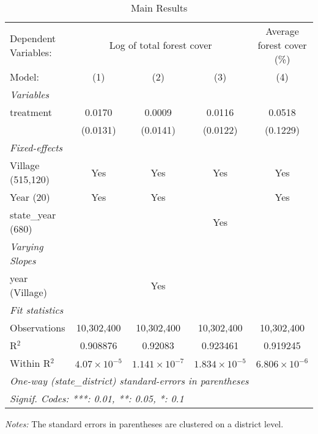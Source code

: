 \begin{table}[htbp]
\centering
\caption{\label{tab:main-results} Main Results}
\begin{tabular}{lcccc}
\tabularnewline\midrule\midrule
Dependent Variables:&\multicolumn{3}{c}{Log of total forest cover}&Average forest cover (\%)\\
Model:&(1) & (2) & (3) & (4)\\
\midrule \emph{Variables}&   &   &   &  \\
treatment&0.0170 & 0.0009 & 0.0116 & 0.0518\\
  &(0.0131) & (0.0141) & (0.0122) & (0.1229)\\
\midrule \emph{Fixed-effects}&   &   &   &  \\
Village (515,120) & Yes & Yes & Yes & Yes\\
Year (20) & Yes & Yes &  & Yes\\
state\_year (680) &  &  & Yes & \\
\midrule \emph{Varying Slopes}&   &   &   &  \\
year (Village) &  & Yes &  & \\
\midrule \emph{Fit statistics}&  & & & \\
Observations & 10,302,400&10,302,400&10,302,400&10,302,400\\
R$^2$ & 0.908876&0.92083&0.923461&0.919245\\
Within R$^2$ & $4.07\times 10^{-5}$&$1.141\times 10^{-7}$&$1.834\times 10^{-5}$&$6.806\times 10^{-6}$\\
\midrule\midrule\multicolumn{5}{l}{\emph{One-way (state\_district) standard-errors in parentheses}}\\
\multicolumn{5}{l}{\emph{Signif. Codes: ***: 0.01, **: 0.05, *: 0.1}}\\
\end{tabular}

\medskip \emph{Notes:} The standard errors in parentheses are clustered on a district level.
\end{table}

